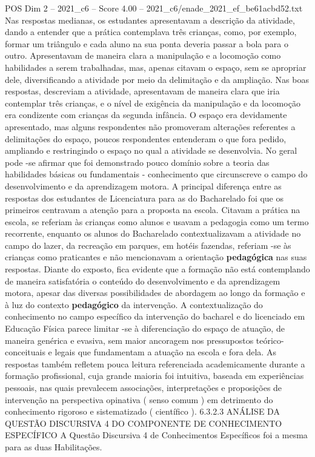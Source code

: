 \begin{textsample}{POS Dim 2 – 2021\_c6 – Score 4.00 – 2021\_c6/enade\_2021\_ef\_be61acbd52.txt}
Nas respostas medianas, os estudantes apresentavam a descrição da atividade, dando a entender que a prática contemplava três crianças, como, por exemplo, formar um triângulo e cada aluno na sua ponta deveria passar a bola para o outro.
Apresentavam de maneira clara a manipulação e a locomoção como habilidades a serem trabalhadas, mas, apenas citavam o espaço, sem se apropriar dele, diversificando a atividade por meio da delimitação e da ampliação.
Nas boas respostas, descreviam a atividade, apresentavam de maneira clara que iria contemplar três crianças, e o nível de exigência da manipulação e da locomoção era condizente com crianças da segunda infância.
O espaço era devidamente apresentado, mas alguns respondentes não promoveram alterações referentes a delimitações do espaço, poucos respondentes entenderam o que fora pedido, ampliando e restringindo o espaço no qual a atividade se desenvolvia.
No geral pode -se afirmar que foi demonstrado pouco domínio sobre a teoria das habilidades básicas ou fundamentais - conhecimento que circunscreve o campo do desenvolvimento e da aprendizagem motora.
A principal diferença entre as respostas dos estudantes de Licenciatura para as do Bacharelado foi que os primeiros centravam a atenção para a proposta na escola.
Citavam a prática na escola, se referiam às crianças como alunos e usavam a pedagogia como um termo recorrente, enquanto os alunos do Bacharelado contextualizavam a atividade no campo do lazer, da recreação em parques, em hotéis fazendas, referiam -se às crianças como praticantes e não mencionavam a orientação \textbf{pedagógica} nas suas respostas.
Diante do exposto, fica evidente que a formação não está contemplando de maneira satisfatória o conteúdo do desenvolvimento e da aprendizagem motora, apesar das diversas possibilidades de abordagem ao longo da formação e à luz do contexto \textbf{pedagógico} da intervenção.
A contextualização do conhecimento no campo específico da intervenção do bacharel e do licenciado em Educação Física parece limitar -se à diferenciação do espaço de atuação, de maneira genérica e evasiva, sem maior ancoragem nos pressupostos teórico-conceituais e legais que fundamentam a atuação na escola e fora dela.
As respostas também refletem pouca leitura referenciada academicamente durante a formação profissional, cuja grande maioria foi intuitiva, baseada em experiências pessoais, nas quais prevalecem associações, interpretações e proposições de intervenção na perspectiva opinativa ( senso comum ) em detrimento do conhecimento rigoroso e sistematizado ( científico ). 6.3.2.3 ANÁLISE DA QUESTÃO DISCURSIVA 4 DO COMPONENTE DE CONHECIMENTO ESPECÍFICO A Questão Discursiva 4 de Conhecimentos Específicos foi a mesma para as duas Habilitações.

\end{textsample}
